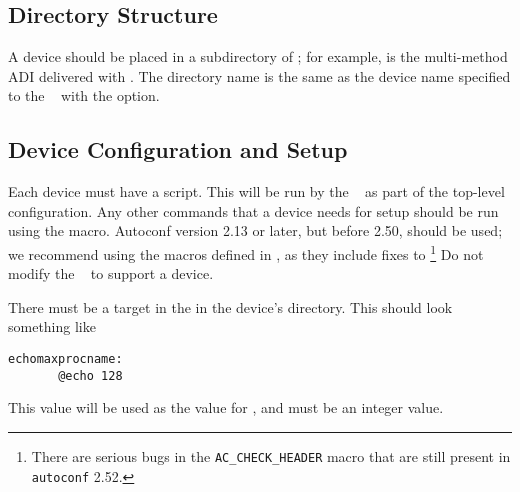\subsection{Directory Structure}
\label{sec:adi3-dirs}
A device should be placed in a subdirectory of ;
for example,  is the multi-method ADI
delivered with \mpich.  The directory name is the same as the device
name specified to the \mpich\  with the
 option.

\subsection{Device Configuration and Setup}
\label{sec:adi3-setup}
Each device must have a  script.  This will be run by
the \mpich\  as part of the top-level configuration.
Any other commands that a device needs for setup should be run using
the   macro.  Autoconf version
2.13 or later, but before 2.50, should be used; we recommend using the
macros defined in 
, as they include fixes to
\footnote{There are serious bugs in the
\texttt{AC\_CHECK\_HEADER} macro that are still present in
\texttt{autoconf} 2.52.}
Do not modify the \mpich\  to support a device.

There must be a  target in the 
in the device's directory.  This should look something like
\begin{verbatim}
echomaxprocname:
       @echo 128
\end{verbatim}
This value will be used as the value for
, and must be an integer value.

